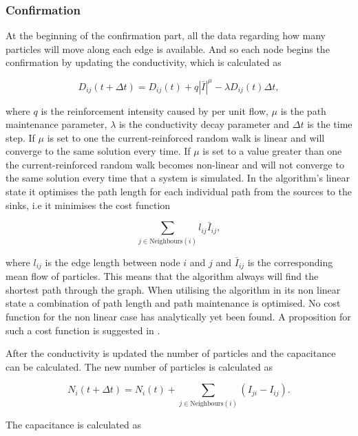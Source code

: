 \subsubsection{Confirmation}
\label{sec:confirmation}
At the beginning of the confirmation part, all the data regarding how many particles will move along each edge is available. And so each node begins the confirmation by updating the conductivity, which is calculated as

\begin{equation}
D_{ij}(t + \Delta t) = D_{ij}(t) + q|\bar{I}|^\mu - \lambda D_{ij}(t)\Delta t,
\end{equation}

 \noindent where $q$ is the reinforcement intensity caused by per unit flow, $\mu$ is the path maintenance parameter, $\lambda$ is the conductivity decay parameter and $\Delta t$ is the time step. If $\mu$ is set to one the current-reinforced random walk is linear and will converge to the same solution every time. If $\mu$ is set to a value greater than one the current-reinforced random walk becomes non-linear and will not converge to the same solution every time that a system is simulated. In the algorithm's linear state it optimises the path length for each individual path from the sources to the sinks, i.e it minimises the cost function

\begin{equation}
\sum_{j \in \text{Neighbours}(i)} l_{ij} \bar{I}_{ij},
\end{equation}

 \noindent where $l_{ij}$ is the edge length between node $i$ and $j$ and $\bar{I}_{ij}$ is the corresponding mean flow of particles. This means that the algorithm always will find the shortest path through the graph. When utilising the algorithm in its non linear state a combination of path length and path maintenance is optimised. No cost function for the non linear case has analytically yet been found. A proposition for such a cost function is suggested in \cite{Sumpter}. 

After the conductivity is updated the number of particles and the capacitance can be calculated. The new number of particles is calculated as

 \begin{equation}
 N_i(t + \Delta t) = N_i(t) + \sum_{j \in \text{Neighbours}(i)} \left( I_{ji} - I_{ij} \right).
 \end{equation}

 \noindent The capacitance is calculated as 

